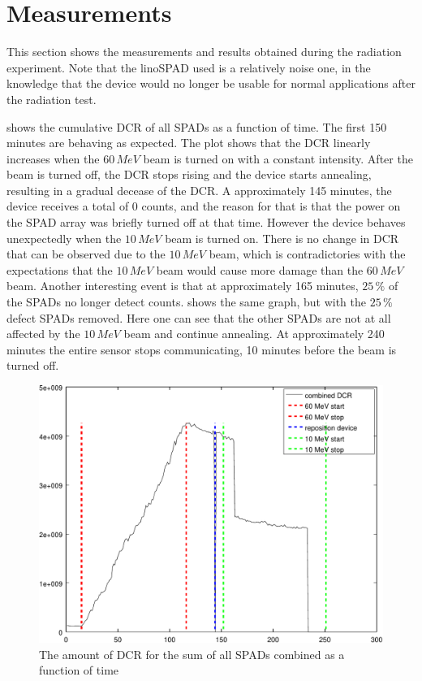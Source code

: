 \section{Measurements}\label{ssec:results}
This section shows the measurements and results obtained during the radiation experiment. Note that the linoSPAD used is a relatively noise one, in the knowledge that the device  would no longer be usable for normal applications after the radiation test.

 shows the cumulative DCR of all SPADs as a function of time. The first 150 minutes are behaving as expected. The plot shows that the DCR linearly increases when the $60\,MeV$ beam  is turned on with a constant intensity. After the beam is turned off, the DCR stops rising and the device starts annealing, resulting in a gradual decease of the DCR. A approximately 145 minutes, the device receives a total of 0 counts, and the reason for that is that the power on the SPAD array was briefly turned off at that time. However the device behaves unexpectedly when the $10\,MeV$ beam is turned on. There is no change in DCR that can be observed due to the $10\,MeV$ beam, which is contradictories with the expectations that the $10\,MeV$ beam would cause more damage than the $60\,MeV$ beam. Another interesting event is that at approximately 165 minutes, $25\,\%$ of the SPADs no longer detect counts.  shows the same graph, but with the $25\,\%$ defect SPADs removed. Here one can see that the other SPADs are not at all affected by the $10\,MeV$ beam and continue annealing. At approximately 240 minutes the entire sensor stops communicating, 10 minutes before the beam is turned off.



\begin{figure}[h]
\centering
	\includegraphics[width=0.6\linewidth]{fig/count_vs_time_sum_all.pdf}
\caption{The amount of DCR for the sum of all SPADs combined as a function of time}
\label{fig:count_vs_time_sum_all}
\end{figure}


